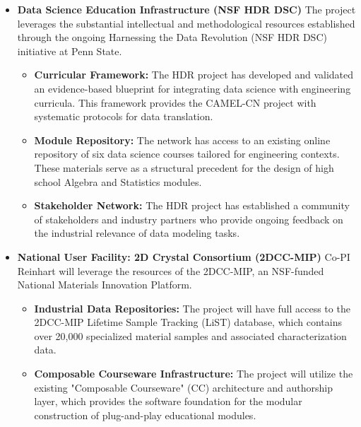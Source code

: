 \documentclass[11pt]{article}
\begin{document}
\begin{itemize}
\item \textbf{Data Science Education Infrastructure (NSF HDR DSC)}
The project leverages the substantial intellectual and methodological resources established through the ongoing Harnessing the Data Revolution (NSF HDR DSC) initiative at Penn State. 
    \begin{itemize}[noitemsep]
        \item \textbf{Curricular Framework:} The HDR project has developed and validated an evidence-based blueprint for integrating data science with engineering curricula. This framework provides the CAMEL-CN project with systematic protocols for data translation.
        \item \textbf{Module Repository:} The network has access to an existing online repository of six data science courses tailored for engineering contexts. These materials serve as a structural precedent for the design of high school Algebra and Statistics modules.
        \item \textbf{Stakeholder Network:} The HDR project has established a community of stakeholders and industry partners who provide ongoing feedback on the industrial relevance of data modeling tasks.
    \end{itemize}
    
\item \textbf{National User Facility: 2D Crystal Consortium (2DCC-MIP)}
Co-PI Reinhart will leverage the resources of the 2DCC-MIP, an NSF-funded National Materials Innovation Platform.
\begin{itemize}[noitemsep]
    \item \textbf{Industrial Data Repositories:} The project will have full access to the 2DCC-MIP Lifetime Sample Tracking (LiST) database, which contains over 20,000 specialized material samples and associated characterization data. 
    \item \textbf{Composable Courseware Infrastructure:} The project will utilize the existing "Composable Courseware" (CC) architecture and authorship layer, which provides the software foundation for the modular construction of plug-and-play educational modules.
\end{itemize}


\end{itemize}
\end{document}
